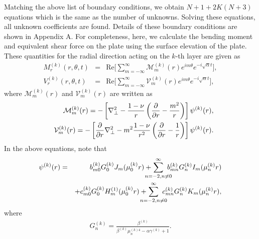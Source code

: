 \documentclass{jfm}
\def\p{\partial}
\def\f{\frac}
\def\lp{\left(}
\def\rp{\right)}
\def\th{\theta}
\begin{document}
Matching the above list of boundary conditions, we obtain $N+1+2K(N+3)$ equations which is the same as the number of unknowns. Solving these equations, all unknown coefficients are found. Details of these boundary conditions are shown in Appendix A. For completeness, here, we calculate the bending moment and equivalent shear force on the plate using the surface elevation of the plate. These quantities for the radial direction acting on the $k$-th layer are given as
\begin{eqnarray}
  M^{(k)}_r (r, \theta, t)  &=& \text{Re}\bigg[\sum_{m=-\infty}^{\infty} \mathcal{M}_m^{(k)}(r) e^{im\th}e^{-i\sqrt{\alpha} t} \bigg],\label{eq23:01}\\
  V^{(k)}_r (r, \theta, t) & =& \text{Re}\bigg[\sum_{m=-\infty}^{\infty} \mathcal{V}_m^{(k)}(r) e^{im\th} e^{-i\sqrt{\alpha} t} \bigg],\label{eq23:02} 
\end{eqnarray}
where $\mathcal{M}_m^{(k)} (r)$ and $\mathcal{V}_m^{(k)} (r)$ are written as
\begin{eqnarray}
\displaystyle&& \mathcal{M}_m^{(k)} (r) = -\left[ \nabla^2_\perp -\f{1-\nu}{r}\lp \f{\p}{\p r} -\f{m^2}{r} \rp \right] \psi^{(k)}(r),\label{eq23:03} \\
\displaystyle&&\mathcal{V}_m^{(k)}(r) =-\left[ \f{\p}{\p r}\nabla^2_\perp -m^2\f{1-\nu}{r^2}\lp \f{\p}{\p r} - \f{1}{r} \rp \right] \psi^{(k)}(r).
\label{eq23:04} 
\end{eqnarray}
In the above equations, note that 
\begin{eqnarray}
\displaystyle \psi^{(k)}(r)=&&b^{(k)}_{m0}G^{(k)}_0J_m(\mu^{(k)}_0r)+\hspace{-4mm}\sum_{n=-2,n\ne 0}^\infty \hspace{-3mm}b^{(k)}_{mn}G^{(k)}_nI_m(\mu^{(k)}_nr)\nonumber\\
&&+c^{(k)}_{m0}G^{(k)}_0H_m^{(1)}(\mu^{(k)}_0r)+\hspace{-4mm}\sum_{n=-2,n\ne 0}^\infty \hspace{-3mm}c^{(k)}_{mn}G^{(k)}_nK_m(\mu^{(k)}_nr),\label{eq23:05} 
\end{eqnarray}
where
\begin{eqnarray}
\displaystyle G_n^{(k)}=\frac{\beta^{(k)}}{\beta^{(k)}\mu_n^{(k)4}-\alpha \gamma^{(k)}+1}.\label{eq23:06}
\end{eqnarray}
\end{document}

